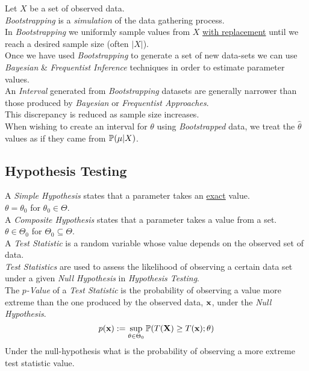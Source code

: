 \documentclass[11pt,a4paper]{article}
\begin{document}
Let $X$ be a set of observed data.\\
\textit{Bootstrapping} is a \textit{simulation} of the data gathering process.\\
In \textit{Bootstrapping} we uniformly sample values from $X$ \underline{with replacement} until we reach a desired sample size (often $|X|$).\\

Once we have used \textit{Bootstrapping} to generate a set of new data-sets we can use \textit{Bayesian} \& \textit{Frequentist Inference} techniques in order to estimate parameter values.\\

An \textit{Interval} generated from \textit{Bootstrapping} datasets are generally narrower than those produced by \textit{Bayesian} or \textit{Frequentist Approaches}.\\
\nb This discrepancy is reduced as sample size increases.\\

When wishing to create an interval for $\theta$ using \textit{Bootstrapped} data, we treat the $\hat\theta$ values as if they came from $\mathbb{P}(\mu|X)$.

\subsection{Hypothesis Testing}

A \textit{Simple Hypothesis} states that a parameter takes an \underline{exact} value.\\
\ie $\theta=\theta_0$ for $\theta_0\in\Theta$.\\

A \textit{Composite Hypothesis} states that a parameter takes a value from a set.\\
\ie $\theta\in\Theta_0$ for $\Theta_0\subseteq\Theta$.\\

A \textit{Test Statistic} is a random variable whose value depends on the observed set of data.\\
\textit{Test Statistics} are used to assess the likelihood of observing a certain data set under a given \textit{Null Hypothesis} in \textit{Hypothesis Testing}.\\

The \textit{$p$-Value} of a \textit{Test Statistic} is the probability of observing a value more extreme than the one produced by the observed data, $\textbf{x}$, under the \textit{Null Hypothesis}.\\
$$p(\textbf{x}):=\sup_{\theta\in\Theta_0}\mathbb{P}(T(\textbf{X})\geq T(\textbf{x});\theta)$$
\ie Under the null-hypothesis what is the probability of observing a more extreme test statistic value.\\
\end{document}
